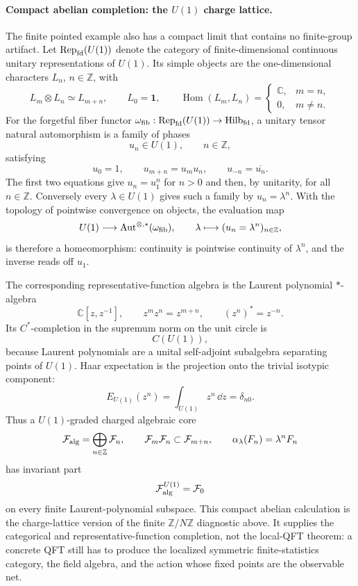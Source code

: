 \paragraph{Compact abelian completion: the \(U(1)\) charge lattice.}
The finite pointed example also has a compact limit that contains no
finite-group artifact.  Let \({\rm Rep}_{\rm fd}(U(1))\) denote the category
of finite-dimensional continuous unitary representations of \(U(1)\).  Its
simple objects are the one-dimensional characters \(L_n\), \(n\in\mathbb Z\),
with
\[
  L_m\otimes L_n\simeq L_{m+n},
  \qquad
  L_0=\mathbf 1,
  \qquad
  \operatorname{Hom}(L_m,L_n)=
  \begin{cases}
    \mathbb C, & m=n,\\
    0, & m\ne n .
  \end{cases}
\]
For the forgetful fiber functor
\(\omega_{\rm fib}:{\rm Rep}_{\rm fd}(U(1))\to{\rm Hilb}_{\rm fd}\), a unitary
tensor natural automorphism is a family of phases
\[
  u_n\in U(1),
  \qquad n\in\mathbb Z,
\]
satisfying
\[
  u_0=1,
  \qquad
  u_{m+n}=u_m u_n,
  \qquad
  u_{-n}=\overline{u_n}.
\]
The first two equations give \(u_n=u_1^n\) for \(n>0\) and then, by unitarity,
for all \(n\in\mathbb Z\).  Conversely every \(\lambda\in U(1)\) gives such a
family by \(u_n=\lambda^n\).  With the topology of pointwise convergence on
objects, the evaluation map
\[
  U(1)\longrightarrow \operatorname{Aut}^{\otimes,*}(\omega_{\rm fib}),
  \qquad
  \lambda\longmapsto (u_n=\lambda^n)_{n\in\mathbb Z},
\]
is therefore a homeomorphism: continuity is pointwise continuity of
\(\lambda^n\), and the inverse reads off \(u_1\).

The corresponding representative-function algebra is the Laurent polynomial
\(*\)-algebra
\[
  \mathbb C[z,z^{-1}],
  \qquad
  z^m z^n=z^{m+n},
  \qquad
  (z^n)^*=z^{-n}.
\]
Its \(C^*\)-completion in the supremum norm on the unit circle is
\[
  C(U(1)),
\]
because Laurent polynomials are a unital self-adjoint subalgebra separating
points of \(U(1)\).  Haar expectation is the projection onto the trivial
isotypic component:
\begin{equation}
  E_{U(1)}(z^n)
  =
  \int_{U(1)} z^n\,\dd z
  =
  \delta_{n0}.
  \label{eq:u1-tannaka-haar-laurent}
\end{equation}
Thus a \(U(1)\)-graded charged algebraic core
\[
  \mathcal F_{\rm alg}
  =
  \bigoplus_{n\in\mathbb Z}\mathcal F_n,
  \qquad
  \mathcal F_m\mathcal F_n\subset\mathcal F_{m+n},
  \qquad
  \alpha_\lambda(F_n)=\lambda^nF_n
\]
has invariant part
\[
  \mathcal F_{\rm alg}^{U(1)}=\mathcal F_0
\]
on every finite Laurent-polynomial subspace.  This compact abelian
calculation is the charge-lattice version of the finite
\(\mathbb Z/N\mathbb Z\) diagnostic above.  It supplies the categorical and
representative-function completion, not the local-QFT theorem: a concrete
QFT still has to produce the localized symmetric finite-statistics category,
the field algebra, and the action whose fixed points are the observable net.


